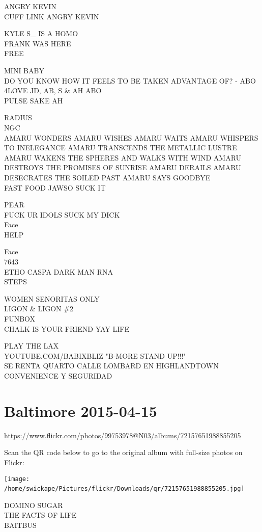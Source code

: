 \documentclass[10pt,letterpaper]{article}
\begin{document}
ANGRY KEVIN\\
CUFF LINK ANGRY KEVIN

KYLE S\_ IS A HOMO\\
FRANK WAS HERE\\
FREE

MINI BABY\\
DO YOU KNOW HOW IT FEELS TO BE TAKEN ADVANTAGE OF? {-} ABO\\
4LOVE JD, AB, S \& AH ABO\\
PULSE SAKE AH

RADIUS\\
NGC\\
AMARU WONDERS AMARU WISHES AMARU WAITS AMARU WHISPERS TO INELEGANCE AMARU TRANSCENDS THE METALLIC LUSTRE AMARU WAKENS THE SPHERES AND WALKS WITH WIND AMARU DESTROYS THE PROMISES OF SUNRISE AMARU DERAILS AMARU DESECRATES THE SOILED PAST AMARU SAYS GOODBYE\\
FAST FOOD JAWSO SUCK IT

PEAR\\
FUCK UR IDOLS SUCK MY DICK\\
Face\\
HELP

Face\\
7643\\
ETHO CASPA DARK MAN RNA\\
STEPS

WOMEN SENORITAS ONLY\\
LIGON \& LIGON \#2\\
FUNBOX\\
CHALK IS YOUR FRIEND YAY LIFE

PLAY THE LAX\\
YOUTUBE.COM/BABIXBLIZ "B{-}MORE STAND UP!!!"\\
SE RENTA QUARTO CALLE LOMBARD EN HIGHLANDTOWN CONVENIENCE Y SEGURIDAD
\

\section*{Baltimore 2015-04-15}

\url{https://www.flickr.com/photos/99753978@N03/albums/72157651988855205}

Scan the QR code below to go to the original album with full-size photos on Flickr:

\texttt{[image: /home/swickape/Pictures/flickr/Downloads/qr/72157651988855205.jpg]}
\

DOMINO SUGAR\\
THE FACTS OF LIFE\\
BAITBUS
\end{document}
